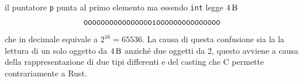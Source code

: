 \documentclass[Lau,binding=0.6cm]{sapthesis}
\newcommand{\textcode}[1]{\colorbox{backcolour}{\texttt{#1}}}
\begin{document}
il puntatore \texttt{p} punta al primo elemento ma essendo \textcode{int} legge $ \SI{4}{\byte} $  
\[
\texttt{00000000000000001000000000000000} \\
\]
che in decimale equivale a $ 2^{16} = 65536 $. La causa di questa confusione sia la la lettura di un solo oggetto da $\SI{4}{\byte} $ anziché due oggetti da 2, questo avviene a causa della rappresentazione di due tipi differenti e del casting che C permette contrariamente a Rust.




%
%

\backmatter

\cleardoublepage
{}


{}
\end{document}
